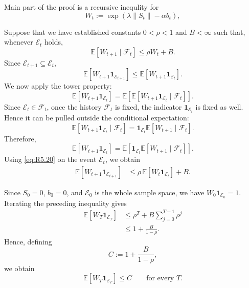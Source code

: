 \documentclass[twoside]{article}
\begin{document}
Main part of the proof is a recursive inequlity for 
\begin{equation}
\label{Wt}
    W_t
    :=
    \exp\left(
        \lambda\|S_t\|-\alpha b_t
    \right),
\end{equation}

Suppose that we have established constants \(0<\rho<1\) and \(B<\infty\)
such that, whenever \(\mathcal E_t\) holds,
\begin{equation}
    \mathbb E\!\left[
        W_{t+1}\mid\mathcal F_t
    \right]
    \le
    \rho W_t+B.
    \tag{R5.20}
    \label{eq:R5.20}
\end{equation}
Since
\(\mathcal E_{t+1}\subseteq\mathcal E_t\),
\[
\mathbb E\left[
    W_{t+1}\mathbf 1_{\mathcal E_{t+1}}
\right]
\le
\mathbb E\left[
    W_{t+1}\mathbf 1_{\mathcal E_t}
\right].
\]
We now apply the tower property:
\[
\mathbb E\left[
    W_{t+1}\mathbf 1_{\mathcal E_t}
\right]
=
\mathbb E\left[
    \mathbb E\left[
        W_{t+1}\mathbf 1_{\mathcal E_t}
        \mid\mathcal F_t
    \right]
\right].
\]
Since \(\mathcal E_t\in\mathcal F_t\), once the history
\(\mathcal F_t\) is fixed, the indicator
\(\mathbf 1_{\mathcal E_t}\) is fixed as well. Hence it can be pulled
outside the conditional expectation:
\[
\mathbb E\left[
    W_{t+1}\mathbf 1_{\mathcal E_t}
    \mid\mathcal F_t
\right]
=
\mathbf 1_{\mathcal E_t}
\mathbb E\left[
    W_{t+1}\mid\mathcal F_t
\right].
\]
Therefore,
\[
\mathbb E\left[
    W_{t+1}\mathbf 1_{\mathcal E_t}
\right]
=
\mathbb E\left[
    \mathbf 1_{\mathcal E_t}
    \mathbb E\left[
        W_{t+1}\mid\mathcal F_t
    \right]
\right].
\]
Using \eqref{eq:R5.20} on the event \(\mathcal E_t\), we obtain
\[
\begin{aligned}
\mathbb E\left[
    W_{t+1}\mathbf 1_{\mathcal E_{t+1}}
\right]
&\le
\rho\,
\mathbb E\left[
    W_t\mathbf 1_{\mathcal E_t}
\right]
+
B.
\end{aligned}
\]


\noindent Since \(S_0=0\), \(b_0=0\), and \(\mathcal E_0\) is the whole sample space, 
we have $W_0\mathbf 1_{\mathcal E_0}=1.$ 
Iterating the preceding inequality gives
\[
\begin{aligned}
    \mathbb E\left[
        W_T\mathbf 1_{\mathcal E_T}
    \right]
    &\le
    \rho^T
    +
    B\sum_{j=0}^{T-1}\rho^j
    \\
    &\le
    1+\frac{B}{1-\rho}.
\end{aligned}
\]
Hence, defining
\begin{equation}
    C
    :=
    1+\frac{B}{1-\rho},
    \tag{R5.21}
    \label{eq:R5.21}
\end{equation}
we obtain
\begin{equation}
    \boxed{
        \mathbb E\left[
            W_T\mathbf 1_{\mathcal E_T}
        \right]
        \le C
    }
    \qquad
    \text{for every }T.
    \tag{R5.22}
    \label{eq:R5.22}
\end{equation}
\end{document}
